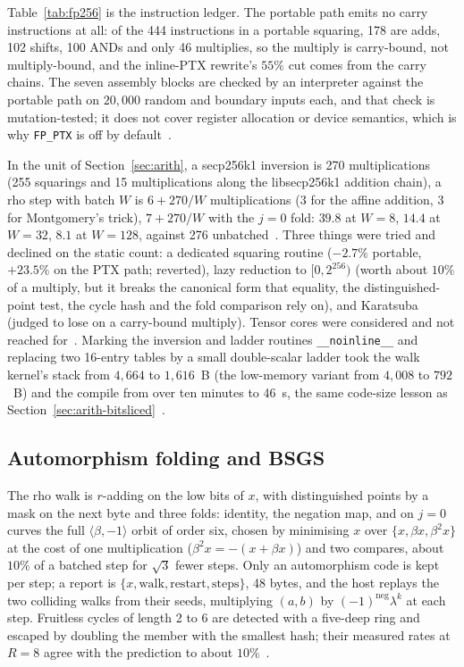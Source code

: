 Table~\ref{tab:fp256} is the instruction ledger. The portable path
emits no carry instructions at all: of the 444 instructions in a
portable squaring, 178 are adds, 102 shifts, 100 ANDs and only 46
multiplies, so the multiply is carry-bound, not multiply-bound, and
the inline-PTX rewrite's $55\%$ cut comes from the carry chains. The
seven assembly blocks are checked by an interpreter against the
portable path on $20{,}000$ random and boundary inputs each, and that
check is mutation-tested; it does not cover register allocation or
device semantics, which is why \texttt{FP\_PTX} is off by
default~.

In the unit of Section~\ref{sec:arith}, a secp256k1 inversion is 270
multiplications (255 squarings and 15 multiplications along the
libsecp256k1 addition chain), a rho step with batch $W$ is $6+270/W$
multiplications ($3$ for the affine addition, $3$ for Montgomery's
trick), $7+270/W$ with the $j=0$ fold: $39.8$ at $W=8$, $14.4$ at
$W=32$, $8.1$ at $W=128$, against 276 unbatched~.
Three things were tried and declined on the static count: a
dedicated squaring routine ($-2.7\%$ portable, $+23.5\%$ on the PTX
path; reverted), lazy reduction to $[0,2^{256})$ (worth about $10\%$
of a multiply, but it breaks the canonical form that equality, the
distinguished-point test, the cycle hash and the fold comparison rely
on), and Karatsuba (judged to lose on a carry-bound multiply). Tensor
cores were considered and not reached for~.
Marking the inversion and ladder routines \texttt{\_\_noinline\_\_}
and replacing two 16-entry tables by a small double-scalar ladder
took the walk kernel's stack from $4{,}664$ to $1{,}616$~B (the
low-memory variant from $4{,}008$ to $792$~B) and the compile from
over ten minutes to 46~s, the same code-size lesson as
Section~\ref{sec:arith-bitsliced}~.

\subsection{Automorphism folding and BSGS}
\label{sec:othergpu-rho}

The rho walk is $r$-adding on the low bits of $x$, with distinguished
points by a mask on the next byte and three folds: identity, the
negation map, and on $j=0$ curves the full $\langle\beta,-1\rangle$
orbit of order six, chosen by minimising $x$ over
$\{x,\beta x,\beta^2 x\}$ at the cost of one multiplication
($\beta^2x=-(x+\beta x)$) and two compares, about $10\%$ of a batched
step for $\sqrt3$ fewer steps. Only an automorphism code is kept per
step; a report is $\{x,\text{walk},\text{restart},\text{steps}\}$, 48
bytes, and the host replays the two colliding walks from their seeds,
multiplying $(a,b)$ by $(-1)^{\text{neg}}\lambda^k$ at each step. Fruitless
cycles of length 2 to 6 are detected with a five-deep ring and escaped
by doubling the member with the smallest hash; their measured rates
at $R=8$ agree with the prediction to about
$10\%$~.

